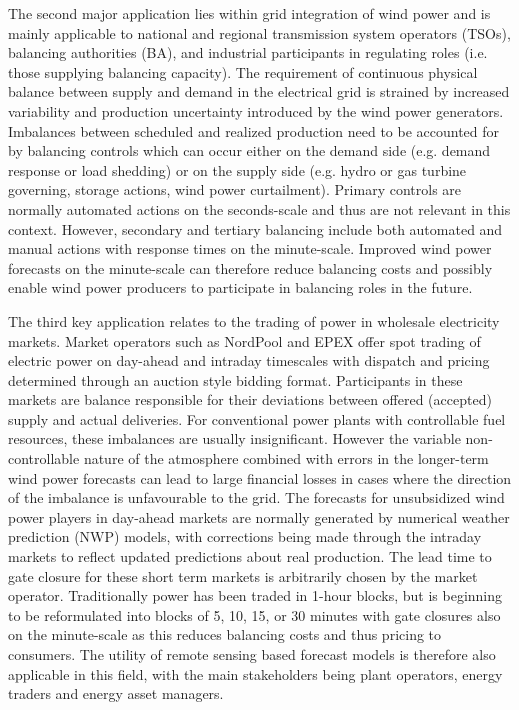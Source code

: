 The second major application lies within grid integration of wind power and is mainly applicable to national and regional transmission system operators (TSOs), balancing authorities (BA), and industrial participants in regulating roles (i.e. those supplying balancing capacity). The requirement of continuous physical balance between supply and demand in the electrical grid is strained by increased variability and production uncertainty introduced by the wind power generators. Imbalances between scheduled and realized production need to be accounted for by balancing controls which can occur either on the demand side (e.g. demand response or load shedding) or on the supply side (e.g. hydro or gas turbine governing, storage actions, wind power curtailment). Primary controls are normally automated actions on the seconds-scale and thus are not relevant in this context. However, secondary and tertiary balancing include both automated and manual actions with response times on the minute-scale. Improved wind power forecasts on the minute-scale can therefore reduce balancing costs and possibly enable wind power producers to participate in balancing roles in the future.

The third key application relates to the trading of power in wholesale electricity markets. Market operators such as NordPool and EPEX offer spot trading of electric power on day-ahead and intraday timescales with dispatch and pricing determined through an auction style bidding format. Participants in these markets are balance responsible for their deviations between offered (accepted) supply and actual deliveries. For conventional power plants with controllable fuel resources, these imbalances are usually insignificant. However the variable non-controllable nature of the atmosphere combined with errors in the longer-term wind power forecasts can lead to large financial losses in cases where the direction of the imbalance is unfavourable to the grid. The forecasts for unsubsidized wind power players in day-ahead markets are normally generated by numerical weather prediction (NWP) models, with corrections being made through the intraday markets to reflect updated predictions about real production. The lead time to gate closure for these short term markets is arbitrarily chosen by the market operator. Traditionally power has been traded in 1-hour blocks, but is beginning to be reformulated into blocks of 5, 10, 15, or 30 minutes with gate closures also on the minute-scale as this reduces balancing costs and thus pricing to consumers. The utility of remote sensing based forecast models is therefore also applicable in this field, with the main stakeholders being plant operators, energy traders and energy asset managers.

